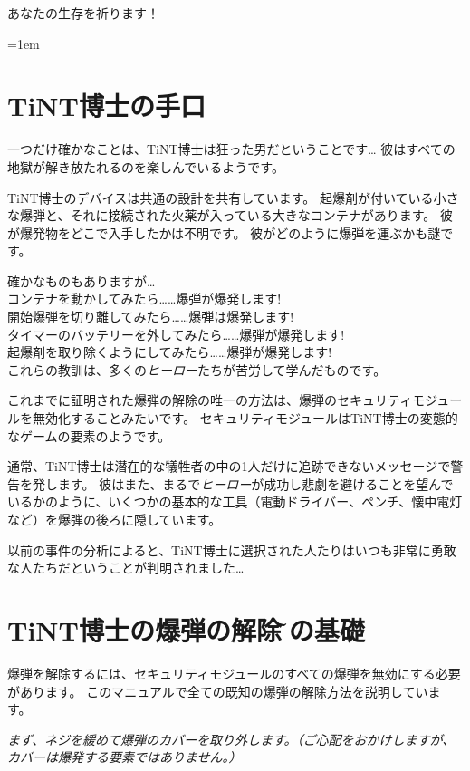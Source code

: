 \vspace{1em}
あなたの生存を祈ります！

%
\parskip=1em
\vspace*{-20mm}
\section*{TiNT博士の手口}
一つだけ確かなことは{、}TiNT博士は狂った男だということです… 彼はすべての地獄が解き放たれるのを楽しんでいるようです。

TiNT博士のデバイスは共通の設計を共有しています。%
起爆剤が付いている小さな爆弾と、それに接続された火薬が入っている大きなコンテナがあります。%
彼が爆発物をどこで入手したかは不明です。%
彼がどのように爆弾を運ぶかも謎です。%

確かなものもありますが…\\
コンテナを動かしてみたら……爆弾が爆発します!\\
開始爆弾を切り離してみたら……爆弾は爆発します!\\
タイマーのバッテリーを外してみたら……爆弾が爆発します!\\
起爆剤を取り除くようにしてみたら……爆弾が爆発します!\\
これらの教訓は、多くの\textit{ヒーロー}たちが苦労して学んだものです。%

これまでに証明された爆弾の解除の唯一の方法は、爆弾のセキュリティモジュールを無効化することみたいです。%
セキュリティモジュールはTiNT博士の変態的なゲームの要素のようです。

通常{、}TiNT博士は潜在的な犠牲者の中の1人だけに追跡できないメッセージで警告を発します。%
彼はまた{、}まるで\textit{ヒーロー}が成功し悲劇を避けることを望んでいるかのように、いくつかの基本的な工具（電動ドライバー、ペンチ、懐中電灯など）を爆弾の後ろに隠しています。%

以前の事件の分析によると{、}TiNT博士に選択された人たりはいつも非常に勇敢な人たちだということが判明されました…

\newpage
\section*{TiNT博士の爆弾の解除\~その基礎}

爆弾を解除するには、セキュリティモジュールのすべての爆弾を無効にする必要があります。%
このマニュアルで全ての既知の爆弾の解除方法を説明しています。%

\textit{まず、ネジを緩めて爆弾のカバーを取り外します。（ご心配をおかけしますが、カバーは爆発する要素ではありません。）}

